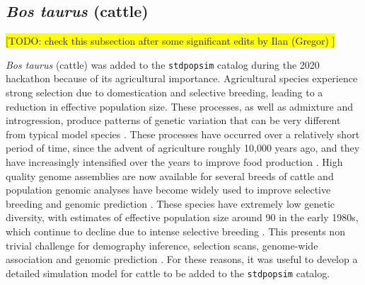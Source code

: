 \documentclass[hidelinks]{article}
\newcommand{\stdpopsim}{\texttt{stdpopsim}\xspace}
\begin{document}
\hypertarget{bos-taurus}{%
	\subsection*{\texorpdfstring{\emph{Bos
				taurus} (cattle)}{Bos taurus (cattle)}}\label{bos-taurus}}

\colorbox{yellow}{[TODO: check this subsection after some significant edits by Ilan (Gregor) ]}


\emph{Bos taurus} (cattle) was added to the \texttt{\stdpopsim} catalog during the 2020 hackathon because of its agricultural importance. Agricultural species experience
strong selection due to domestication and selective breeding, leading
to a reduction in effective population size. These processes,
as well as admixture and introgression, produce patterns
of genetic variation that can be very different from typical model
species \citep{Larson2013}. These processes have occurred over a
relatively short period of time, since the advent of agriculture roughly 10,000 years ago, and they have increasingly intensified over the years to improve food production \citep{Gaut2018,MacLeod2013}. High quality genome assemblies are now
available for several breeds of cattle \citep[e.g.,][]{Rosen2020, Heaton2021,
Talenti2022} and population genomic analyses have become widely used to
improve selective breeding and genomic prediction \citep{Meuwissen2001,
MacLeod2014, Obsteter2021}. These species have extremely low genetic diversity,
with estimates of effective population size around 90 in the early 1980s, which continue to decline due to intense selective breeding \citep{MacLeod2013, VanRaden2020, Makanjouloa2020}. This presents non trivial challenge for demography inference, selection scans, genome-wide association and genomic prediction
\citep{MacLeod2013,MacLeod2014,Hartfield2022}. For these reasons, it was useful to develop a detailed simulation model for cattle to be added to the \texttt{\stdpopsim} catalog.
\end{document}
